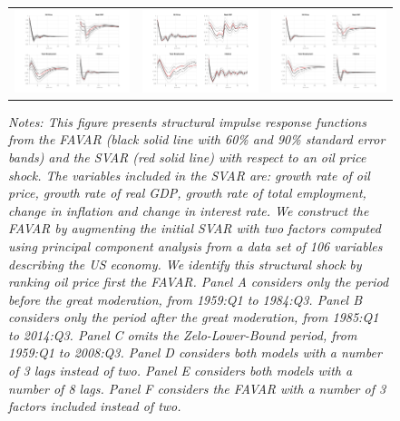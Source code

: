 \documentclass[11pt,a4paper]{article}
\begin{document}
\begin{landscape}
\begin{figure}[H]
\begin{center}
\begin{tabular}{ccc}
				\includegraphics[width=7.5cm]{Figures/Robustness_3lags} &  \includegraphics[width=7.5cm]{Figures/Robustness_8lags}&
				\includegraphics[width=7.5cm]{Figures/Robustness_3factors} 			
			\end{tabular}
		\end{center}
		\footnotesize{\emph{Notes:  
				This figure presents structural impulse response functions from the FAVAR (black solid line with 60\% and 90\% standard error bands) and the SVAR (red solid line) with respect to an oil price shock. 
				The variables included in the SVAR are:  growth rate of  oil price,  growth rate of real GDP,  growth rate of total employment,  change in inflation and  change in interest rate.
				We construct the FAVAR by augmenting the initial SVAR with two factors computed using principal component analysis from a data set of 106 variables describing the US economy. We identify this structural shock by ranking oil price first the FAVAR.
				Panel A considers only the period before the great moderation, from 1959:Q1 to 1984:Q3. 
				Panel B considers only the period after the great moderation, from 1985:Q1 to 2014:Q3. 
				Panel C omits the Zelo-Lower-Bound period, from 1959:Q1 to 2008:Q3.
				Panel D considers both models with a number of 3 lags instead of two.
				Panel E considers both models with a number of 8 lags.
				Panel F considers the FAVAR with a number of 3 factors included instead of two.
			}}	
		\end{figure}
	\end{landscape}
	
\end{document}
